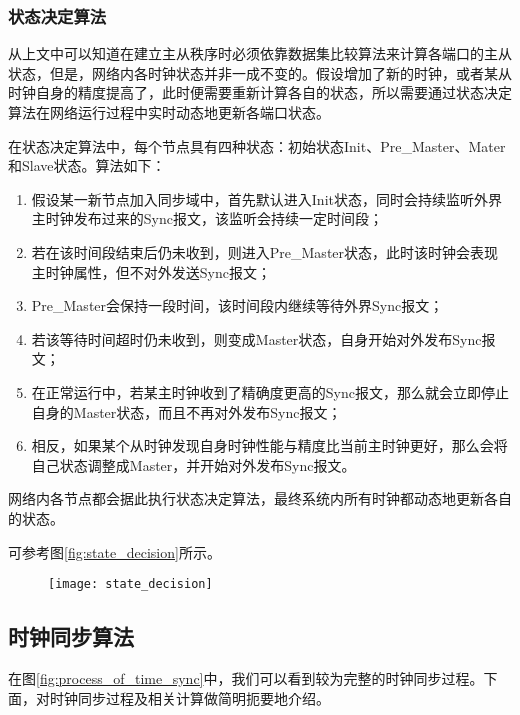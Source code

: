 \subsubsection{状态决定算法}
从上文中可以知道在建立主从秩序时必须依靠数据集比较算法来计算各端口的主从状态，但是，网络内各时钟状态并非一成不变的。假设增加了新的时钟，或者某从时钟自身的精度提高了，此时便需要重新计算各自的状态，所以需要通过状态决定算法在网络运行过程中实时动态地更新各端口状态。

在状态决定算法中，每个节点具有四种状态：初始状态Init、Pre\_Master、Mater和Slave状态。算法如下：
\begin{enumerate}[noitemsep,topsep=0pt,parsep=0pt,partopsep=0pt]
	\item 假设某一新节点加入同步域中，首先默认进入Init状态，同时会持续监听外界主时钟发布过来的Sync报文，该监听会持续一定时间段；
	\item 若在该时间段结束后仍未收到，则进入Pre\_Master状态，此时该时钟会表现主时钟属性，但不对外发送Sync报文；
	\item Pre\_Master会保持一段时间，该时间段内继续等待外界Sync报文；
	\item 若该等待时间超时仍未收到，则变成Master状态，自身开始对外发布Sync报文；
	\item 在正常运行中，若某主时钟收到了精确度更高的Sync报文，那么就会立即停止自身的Master状态，而且不再对外发布Sync报文；
	\item 相反，如果某个从时钟发现自身时钟性能与精度比当前主时钟更好，那么会将自己状态调整成Master，并开始对外发布Sync报文。
\end{enumerate}

网络内各节点都会据此执行状态决定算法，最终系统内所有时钟都动态地更新各自的状态。

可参考图\ref{fig:state_decision}所示。

\begin{figure}[!hbp]
  \centering
  \begin{minipage}[b]{0.8\textwidth}
    \captionstyle{\centering}
    \centering
    \texttt{[image: state\_decision]}
  \end{minipage}     
\end{figure}

\subsection{时钟同步算法}
\label{sec:1588_theory_sync}
在图\ref{fig:process_of_time_sync}中，我们可以看到较为完整的时钟同步过程。下面，对时钟同步过程及相关计算做简明扼要地介绍。

